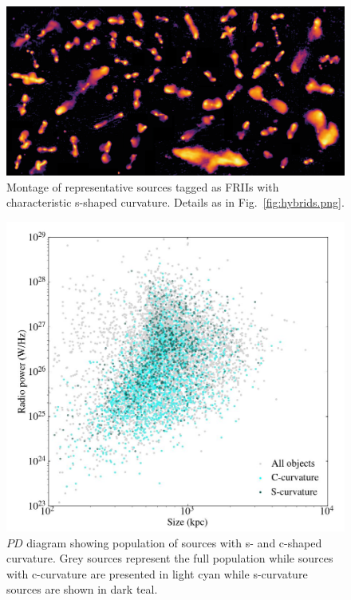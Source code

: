\documentclass{aa}
\begin{document}
\begin{figure}
\includegraphics[width=1\linewidth]{Images/galaxies/curved-friis.png}
\caption{Montage of representative sources tagged as FRIIs with characteristic s-shaped curvature. Details as in Fig.\ \ref{fig:hybrids.png}.}
\label{fig:curved-friis.png}
\end{figure}

\begin{figure}
\includegraphics[width=1\linewidth]{Images/galaxies/c-s_curvature.png}
\caption{$PD$ diagram showing population of sources with s- and c-shaped curvature. Grey sources represent the full population while sources with c-curvature are presented in light cyan while s-curvature sources are shown in dark teal.}
\label{fig:c-s_curvature.png}
\end{figure}
\end{document}
